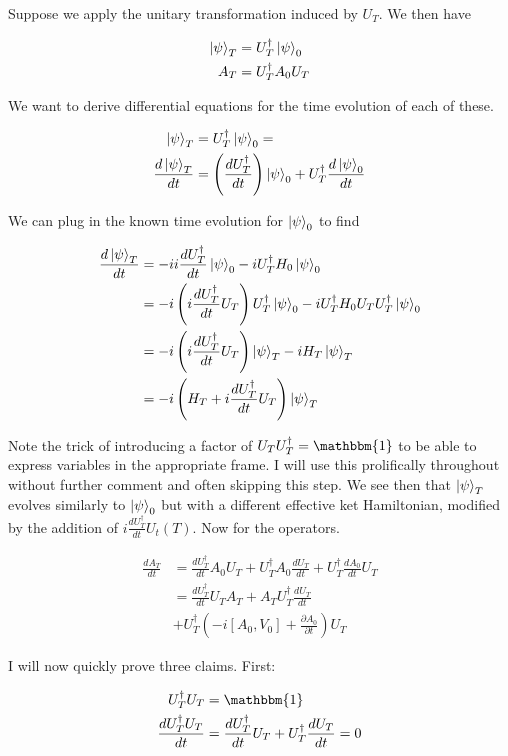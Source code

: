 \documentclass[12pt]{article}
\newcommand{\ddt}[1]{\frac{d #1}{dt}}
\begin{document}
Suppose we apply the unitary transformation induced by $U_T$. We then have

\begin{align}
\ket{\psi}_T &= U_T^{\dag} \ket{\psi}_0\\
A_T &= U_T^{\dag} A_0 U_T
\end{align}

We want to derive differential equations for the time evolution of each of these.

\begin{align}
\ket{\psi}_T &= U_T^{\dag}\ket{\psi}_0 =\\
\ddt{\ket{\psi}_T} &= \left(\ddt{U_T^{\dag}} \right) \ket{\psi}_0 + U_T^{\dag} \ddt{\ket{\psi}_0}
\end{align}

We can plug in the known time evolution for $\ket{\psi}_0$ to find

\begin{align}
\ddt{\ket{\psi}_T} &= -i i\ddt{U_T^{\dag}} \ket{\psi}_0 -i U_T^{\dag} H_0 \ket{\psi}_0\\
&= -i \left(i\ddt{U_T^{\dag}} U_T\right) U_T^{\dag} \ket{\psi}_0 -i U_T^{\dag} H_0U_TU_T^{\dag} \ket{\psi}_0\\
&= -i \left(i\ddt{U_T^{\dag}} U_T\right) \ket{\psi}_T - i H_T \ket{\psi}_T\\
&= -i \left(H_T + i \ddt{U_T^{\dag}} U_T\right)\ket{\psi}_T
\end{align}

Note the trick of introducing a factor of $U_TU_T^{\dag} = \mathbbm{1}$ to be able to express variables in the appropriate frame. I will use this prolifically throughout without further comment and often skipping this step.
We see then that $\ket{\psi}_T$ evolves similarly to $\ket{\psi}_0$ but with a different effective ket Hamiltonian, modified by the addition of $i \ddt{U_T^{\dag}} U_t(T)$. Now for the operators.

\begin{align}
\ddt{A_T} &= \ddt{U_T^{\dag}}A_0U_T + U_T^{\dag}A_0\ddt{U_T} + U_T^{\dag} \ddt{A_0} U_T\\
&= \ddt{U_T^{\dag}} U_TA_T + A_T U_T^{\dag} \ddt{U_T}\\
&+ U_T^{\dag} \left(-i[A_0,V_0] + \frac{\partial A_0}{\partial t}\right)U_T
\end{align}

I will now quickly prove three claims.  First:

\begin{align}
U_T^{\dag} U_T &= \mathbbm{1}\\
\ddt{U_T^{\dag} U_T} &= \ddt{U_T^{\dag}}U_T + U_T^{\dag} \ddt{U_T} = 0
\end{align}
\end{document}
